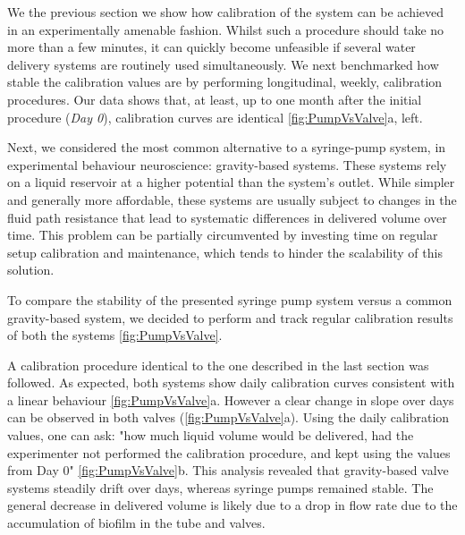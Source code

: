 We the previous section we show how calibration of the system can be achieved in an experimentally amenable fashion. Whilst such a procedure should take no more than a few minutes, it can quickly become unfeasible if several water delivery systems are routinely used simultaneously. We next benchmarked how stable the calibration values are by performing longitudinal, weekly, calibration procedures. Our data shows that, at least, up to one month after the initial procedure (\textit{Day 0}), calibration curves are identical \cref{fig:PumpVsValve}a, left.

Next, we considered the most common alternative to a syringe-pump system, in experimental behaviour neuroscience: gravity-based systems. These systems rely on a liquid reservoir at a higher potential than the system's outlet. While simpler and generally more affordable, these systems are usually subject to changes in the fluid path resistance that lead to systematic differences in delivered volume over time. This problem can be partially circumvented by investing time on regular setup calibration and maintenance, which tends to hinder the scalability of this solution.

To compare the stability of the presented syringe pump system versus a common gravity-based system, we decided to perform and track regular calibration results of both the systems \cref{fig:PumpVsValve}.

A calibration procedure identical to the one described in the last section was followed. As expected, both systems show daily calibration curves consistent with a linear behaviour \cref{fig:PumpVsValve}a. However a clear change in slope over days can be observed in both valves (\cref{fig:PumpVsValve}a). Using the daily calibration values, one can ask: "how much liquid volume would be delivered, had the experimenter not performed the calibration procedure, and kept using the values from Day 0" \cref{fig:PumpVsValve}b. This analysis revealed that gravity-based valve systems steadily drift over days, whereas syringe pumps remained stable. The general decrease in delivered volume is likely due to a drop in flow rate due to the accumulation of biofilm in the tube and valves. 

